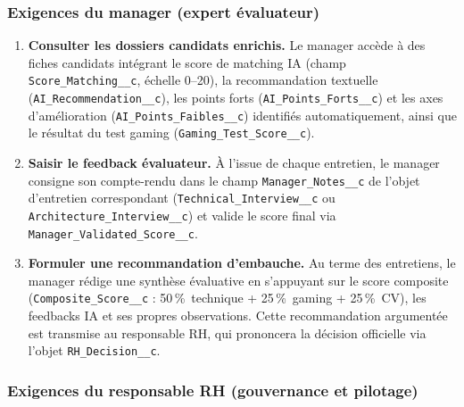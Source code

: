 \subsubsection{Exigences du manager (expert évaluateur)}

\begin{enumerate}[label=\textbf{EF-M\arabic*}]
    \item \textbf{Consulter les dossiers candidats enrichis.} Le manager accède à des fiches candidats intégrant le score de matching IA (champ \texttt{Score\_Matching\_\_c}, échelle 0--20), la recommandation textuelle (\texttt{AI\_Recommendation\_\_c}), les points forts (\texttt{AI\_Points\_Forts\_\_c}) et les axes d'amélioration (\texttt{AI\_Points\_Faibles\_\_c}) identifiés automatiquement, ainsi que le résultat du test gaming (\texttt{Gaming\_Test\_Score\_\_c}).
    
    \item \textbf{Saisir le feedback évaluateur.} À l'issue de chaque entretien, le manager consigne son compte-rendu dans le champ \texttt{Manager\_Notes\_\_c} de l'objet d'entretien correspondant (\texttt{Technical\_Interview\_\_c} ou \texttt{Architecture\_Interview\_\_c}) et valide le score final via \texttt{Manager\_Validated\_Score\_\_c}.
    
    \item \textbf{Formuler une recommandation d'embauche.} Au terme des entretiens, le manager rédige une synthèse évaluative en s'appuyant sur le score composite (\texttt{Composite\_Score\_\_c} : 50\,\%~technique + 25\,\%~gaming + 25\,\%~CV), les feedbacks IA et ses propres observations. Cette recommandation argumentée est transmise au responsable RH, qui prononcera la décision officielle via l'objet \texttt{RH\_Decision\_\_c}.
\end{enumerate}

\subsubsection{Exigences du responsable RH (gouvernance et pilotage)}

